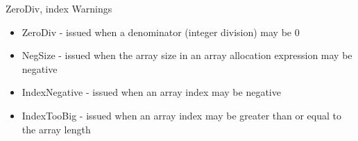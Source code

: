 \documentclass[
pdf,
nocolorBG,
slideColor,
cok,
]{prosper}
\begin{document}
\begin{slide}{ZeroDiv, index Warnings}
\vspace*{-6ex}
\begin{itemize}
\item {\knalblue ZeroDiv} - issued when a denominator (integer division) may be 0
\item {\knalblue NegSize} - issued when the array size in an array allocation expression may be negative
\item {\knalblue IndexNegative} - issued when an array index may be negative
\item {\knalblue IndexTooBig} - issued when an array index may be greater than or equal to the array length
\end{itemize}
{\tiny
\begin{figure*}

\end{figure*}
}
\end{slide}
\end{document}
